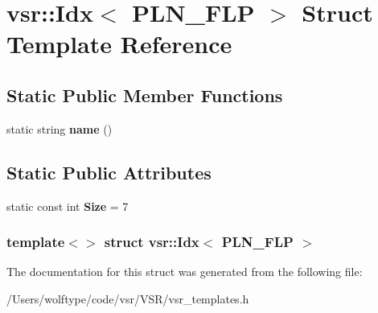 \hypertarget{structvsr_1_1_idx_3_01_p_l_n___f_l_p_01_4}{\section{vsr\-:\-:Idx$<$ P\-L\-N\-\_\-\-F\-L\-P $>$ Struct Template Reference}
\label{structvsr_1_1_idx_3_01_p_l_n___f_l_p_01_4}
}
\subsection*{Static Public Member Functions}
\begin{DoxyCompactItemize}
\item 
\hypertarget{structvsr_1_1_idx_3_01_p_l_n___f_l_p_01_4_a6308561eecc4d7c481069763159afdc7}{static string {\bfseries name} ()}\label{structvsr_1_1_idx_3_01_p_l_n___f_l_p_01_4_a6308561eecc4d7c481069763159afdc7}

\end{DoxyCompactItemize}
\subsection*{Static Public Attributes}
\begin{DoxyCompactItemize}
\item 
\hypertarget{structvsr_1_1_idx_3_01_p_l_n___f_l_p_01_4_a3ba03e23a526d41bc0fb58888ddbb72a}{static const int {\bfseries Size} = 7}\label{structvsr_1_1_idx_3_01_p_l_n___f_l_p_01_4_a3ba03e23a526d41bc0fb58888ddbb72a}

\end{DoxyCompactItemize}
\subsubsection*{template$<$$>$ struct vsr\-::\-Idx$<$ P\-L\-N\-\_\-\-F\-L\-P $>$}



The documentation for this struct was generated from the following file\-:\begin{DoxyCompactItemize}
\item 
/\-Users/wolftype/code/vsr/\-V\-S\-R/vsr\-\_\-templates.\-h\end{DoxyCompactItemize}

